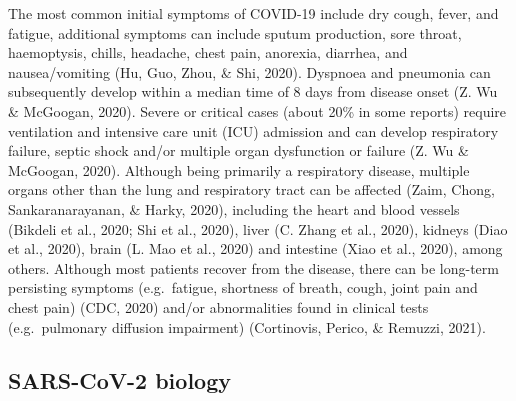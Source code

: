 \documentclass[12pt,twoside,openany,\mydriver]{thesis}  %
\begin{document}
The most common initial symptoms of COVID-19 include dry cough, fever, and fatigue, additional symptoms can include sputum production, sore throat, haemoptysis, chills, headache, chest pain, anorexia, diarrhea, and nausea/vomiting (Hu, Guo, Zhou, \& Shi, 2020). Dyspnoea and pneumonia can subsequently develop within a median time of 8 days from disease onset (Z. Wu \& McGoogan, 2020). Severe or critical cases (about 20\% in some reports) require ventilation and intensive care unit (ICU) admission and can develop respiratory failure, septic shock and/or multiple organ dysfunction or failure (Z. Wu \& McGoogan, 2020). Although being primarily a respiratory disease, multiple organs other than the lung and respiratory tract can be affected (Zaim, Chong, Sankaranarayanan, \& Harky, 2020), including the heart and blood vessels (Bikdeli et al., 2020; Shi et al., 2020), liver (C. Zhang et al., 2020), kidneys (Diao et al., 2020), brain (L. Mao et al., 2020) and intestine (Xiao et al., 2020), among others. Although most patients recover from the disease, there can be long-term persisting symptoms (e.g.~fatigue, shortness of breath, cough, joint pain and chest pain) (CDC, 2020) and/or abnormalities found in clinical tests (e.g.~pulmonary diffusion impairment) (Cortinovis, Perico, \& Remuzzi, 2021).

\hypertarget{sars-cov-2-biology}{%
\subsection{SARS-CoV-2 biology}\label{sars-cov-2-biology}}
\end{document}
